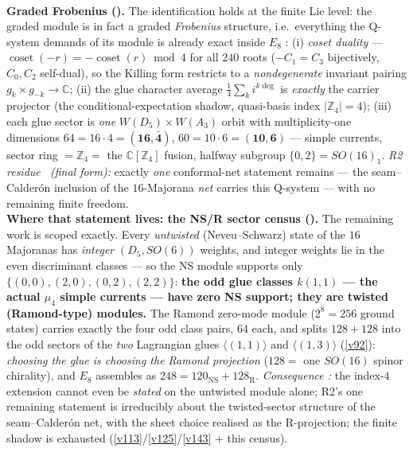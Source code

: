 \documentclass[11pt,a4paper]{article}
\newcommand{\Z}{\mathbb Z}
\begin{document}
\smallskip\\
\noindent\textbf{Graded Frobenius ().} The identification holds at the
finite Lie level: the graded module is in fact a graded \emph{Frobenius} structure,
i.e.\ everything the Q-system demands of its module is already exact inside $E_8$ \mE: (i) \emph{coset
duality} --- $\operatorname{coset}(-r)=-\operatorname{coset}(r)\bmod4$ for all $240$ roots ($-C_1=C_3$
bijectively, $C_0,C_2$ self-dual), so the Killing form restricts to a \emph{nondegenerate} invariant
pairing $g_k\times g_{-k}\to\mathbb C$; (ii) the glue character average $\tfrac14\sum_k i^{k\deg}$ is
\emph{exactly} the carrier projector (the conditional-expectation shadow, quasi-basis index $|\Z_4|=4$);
(iii) each glue sector is \emph{one} $W(D_5){\times}W(A_3)$ orbit with multiplicity-one dimensions
$64=16\cdot4=(\mathbf{16},\bar{\mathbf4})$, $60=10\cdot6=(\mathbf{10},\mathbf6)$ --- simple currents,
sector ring $=\Z_4=$ the $\mathbb C[\Z_4]$ fusion, halfway subgroup $\{0,2\}=SO(16)_1$. \emph{R2 residue
\mC\ (final form):} exactly \emph{one} conformal-net statement remains --- the seam--Calder\'on inclusion
of the $16$-Majorana \emph{net} carries this Q-system --- with no remaining finite freedom.
\smallskip\\
\noindent\textbf{Where that statement lives: the NS/R sector census ().}
The remaining work is scoped exactly. Every \emph{untwisted} (Neveu--Schwarz) state of the $16$
Majoranas has \emph{integer} $(D_5,SO(6))$ weights, and integer weights lie in the even discriminant
classes --- so the NS module supports only $\{(0,0),(2,0),(0,2),(2,2)\}$: \textbf{the odd glue classes
$k(1,1)$ --- the actual $\mu_4$ simple currents --- have zero NS support; they are twisted
(Ramond-type) modules.} The Ramond zero-mode module ($2^8=256$ ground states) carries exactly the four
odd class pairs, $64$ each, and splits $128+128$ into the odd sectors of the \emph{two} Lagrangian
glues $\langle(1,1)\rangle$ and $\langle(1,3)\rangle$ (\vref{v92}): \emph{choosing the glue is choosing
the Ramond projection} ($128=$ one $SO(16)$ spinor chirality), and $E_8$ assembles as
$248=120_{\mathrm{NS}}+128_{\mathrm R}$. \emph{Consequence \mC:} the index-$4$ extension cannot even be
\emph{stated} on the untwisted module alone; R2's one remaining statement is irreducibly about the
twisted-sector structure of the seam--Calder\'on net, with the sheet choice realised as the R-projection;
the finite shadow is exhausted (\vref{v113}/\vref{v125}/\vref{v143} $+$ this census).
\end{document}
